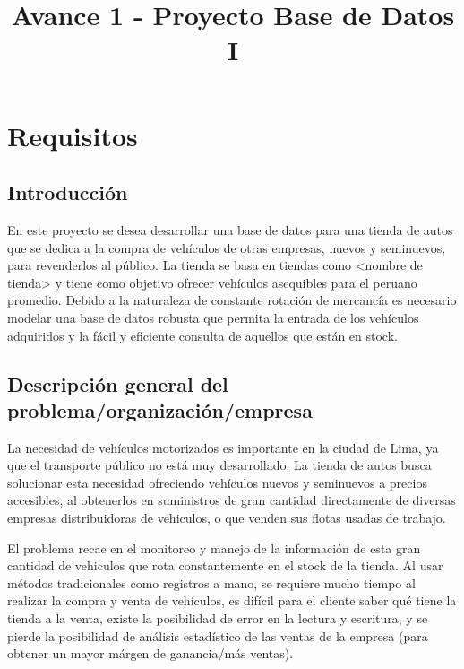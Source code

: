 \documentclass[12pt]{article}
\title{Avance 1 - Proyecto Base de Datos I}
\author{}
\begin{document}
\maketitle

\tableofcontents

\newpage

\section{Requisitos}

\subsection{Introducci\'on}

En este proyecto se desea desarrollar una base de datos para una tienda de autos que se dedica a la compra de vehículos de otras empresas, nuevos y seminuevos, para revenderlos al público. La tienda se basa en tiendas como <nombre de tienda> y tiene como objetivo ofrecer vehículos asequibles para el peruano promedio. Debido a la naturaleza de constante rotación de mercancía es necesario modelar una base de datos robusta que permita la entrada de los vehículos adquiridos y la fácil y eficiente consulta de aquellos que están en stock. 

\subsection{Descripci\'on general del problema/organizaci\'on/empresa}

La necesidad de vehículos motorizados es importante en la ciudad de Lima, ya que el transporte público no está muy desarrollado. La tienda de autos busca solucionar esta necesidad ofreciendo vehículos nuevos y seminuevos a precios accesibles, al obtenerlos en suministros de gran cantidad directamente de diversas empresas distribuidoras de vehiculos, o que venden sus flotas usadas de trabajo.

El problema recae en el monitoreo y manejo de la información de esta gran cantidad de vehiculos que rota constantemente en el stock de la tienda. Al usar métodos tradicionales como registros a mano, se requiere mucho tiempo al realizar la compra y venta de vehículos, es difícil para el cliente saber qué tiene la tienda a la venta, existe la posibilidad de error en la lectura y escritura, y se pierde la posibilidad de análisis estadístico de las ventas de la empresa (para obtener un mayor márgen de ganancia/más ventas).
\end{document}
